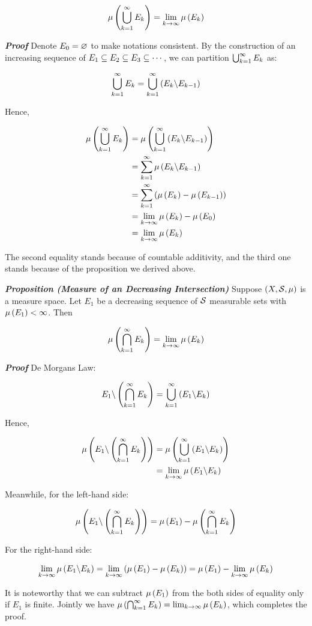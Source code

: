 \documentclass[
]{article}
\begin{document}
\[\mu\pr{\uinf E_k} = \lim_{k\to \infty}\mu\pr{E_k}\]

\emph{\textbf{Proof}} Denote \(E_0 = \empty\) to make notations
consistent. By the construction of an increasing sequence of
\(E_1\se E_2\se E_3\se \cdots\), we can partition \(\uinf E_k\) as:

\[\uinf E_k =\uinf\pr{E_k\c E_{k-1}}\]

Hence,

\[\ba
\mu\pr{\uinf E_k} & = \mu\pr{\uinf \pr{E_k\c E_{k-1}}}\\
& = \sinf \mu\pr{E_k\c E_{k-1}}\\
& = \sinf \pr{\mu\pr{E_k}-\mu\pr{E_{k-1}}}\\
& = \lim_{k \to \infty}\mu\pr{E_k}-\mu\pr{E_0}\\
& = \lim_{k \to \infty}\mu\pr{E_k}
\ea\]

The second equality stands because of countable additivity, and the
third one stands because of the proposition we derived above.

\emph{\textbf{Proposition (Measure of an Decreasing Intersection)}}
Suppose \(\pr{X,\S,\mu}\) is a measure space. Let \(E_1\) be a
decreasing sequence of \(\S\) measurable sets with
\(\mu\pr{E_1}<\infty\). Then

\[\mu\pr{\bigcap_{k = 1}^{\infty}E_k} = \lim_{k\to \infty}\mu\pr{E_k}\]

\emph{\textbf{Proof}} De Morgan\textquotesingle s Law:

\[E_1\c \pr{\bigcap_{k = 1}^{\infty}E_k} = \uinf \pr{E_1\c E_k}\]

Hence,

\[\ba
\mu\pr{E_1\c \pr{\bigcap_{k = 1}^{\infty}E_k}} & = \mu\pr{\uinf \pr{E_1\c E_k}}\\
& = \lim_{k\to\infty}\mu\pr{E_1\c E_k}
\ea\]

Meanwhile, for the left-hand side:

\[\mu\pr{E_1\c \pr{\bigcap_{k = 1}^{\infty}E_k}} = \mu\pr{E_1}-\mu\pr{\bigcap_{k = 1}^{\infty}E_k}\]

For the right-hand side:

\[\lim_{k \to\infty} \mu\pr{E_1\c E_k} = \lim_{k\to \infty}\pr{\mu\pr{E_1}-\mu\pr{E_k}} = \mu\pr{E_1}-\lim_{k\to \infty}\mu\pr{E_k}\]

It is noteworthy that we can subtract \(\mu\pr{E_1}\) from the both
sides of equality only if \(E_1\) is finite. Jointly we have
\(\mu\pr{\bigcap_{k = 1}^{\infty}E_k} = \lim_{k\to \infty}\mu\pr{E_k}\),
which completes the proof.
\end{document}
